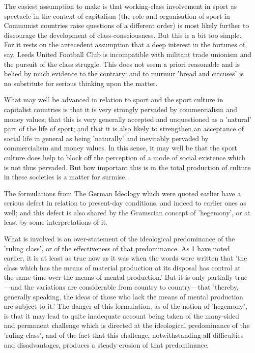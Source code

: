 The easiest assumption to make is that working-class involvement in sport as spectacle in the context of capitalism (the role and organisation of sport in Communist countries raise questions of a different order) is most likely further to discourage the development of class-consciousness. But this is a bit too simple. For it rests on the antecedent assumption that a deep interest in the fortunes of, say, Leeds United Football Club is incompatible with militant trade unionism and the pursuit of the class struggle. This does not seem a priori reasonable and is belied by much evidence to the contrary; and to murmur 'bread and circuses' is no substitute for serious thinking upon the matter.

What may well be advanced in relation to sport and the sport culture in capitalist countries is that it is very strongly pervaded by commercialism and money values; that this is very generally accepted and unquestioned as a 'natural' part of the life of sport; and that it is also likely to strengthen an acceptance of social life in general as being 'naturally' and inevitably pervaded by commercialism and money values. In this sense, it may well be that the sport culture does help to block off the perception of a mode of social existence which is not thus pervaded. But how important this is in the total production of culture in these societies is a matter for surmise.

The formulations from The German Ideology which were quoted earlier have a serious defect in relation to present-day conditions, and indeed to earlier ones as well; and this defect is also shared by the Gramscian concept of 'hegemony', or at least by some interpretations of it.

What is involved is an over-statement of the ideological predominance of the 'ruling class', or of the effectiveness of that predominance. As 1 have noted earlier, it is at least as true now as it was when the words were written that 'the class which has the means of material production at its disposal has control at the same time over the means of mental production.' But it is only partially true—and the variations are considerable from country to country—that 'thereby, generally speaking, the ideas of those who lack the means of mental production are subject to it.' The danger of this formulation, as of the notion of 'hegemony', is that it may lead to quite inadequate account being taken of the many-sided and permanent challenge which is directed at the ideological predominance of the 'ruling class', and of the fact that this challenge, notwithstanding all difficulties and disadvantages, produces a steady erosion of that predominance.


